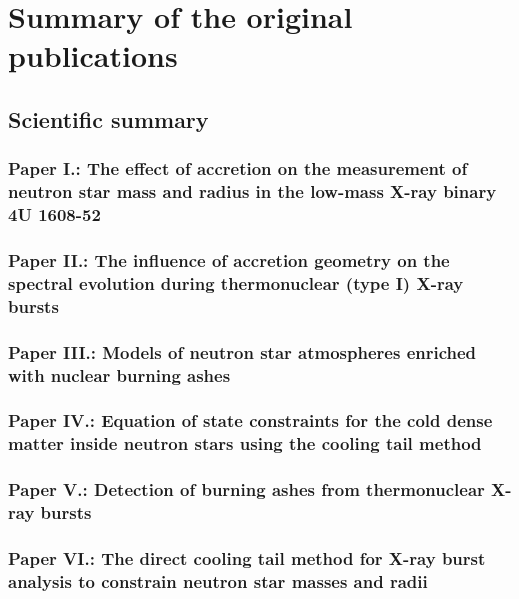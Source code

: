 \chapter{Summary of the original publications}

\section{Scientific summary}










\subsection*{Paper I.: The effect of accretion on the measurement of neutron star mass and radius in the low-mass X-ray binary 4U 1608-52}


\subsection*{Paper II.: The influence of accretion geometry on the spectral evolution during thermonuclear (type I) X-ray bursts}


\subsection*{Paper III.: Models of neutron star atmospheres enriched with nuclear burning ashes}


\subsection*{Paper IV.: Equation of state constraints for the cold dense matter inside neutron stars using the cooling tail method}


\subsection*{Paper V.: Detection of burning ashes from thermonuclear X-ray bursts}


\subsection*{Paper VI.: The direct cooling tail method for X-ray burst analysis to constrain neutron star masses and radii}


